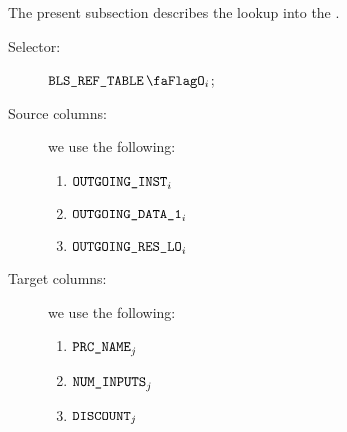 The present subsection describes the lookup into the \blsRefTable{}.
\begin{description}
	\item[Selector:] $\blsRefTableFlag{}_{i}$;
	\item[Source columns:] we use the following:
		\begin{multicols}{3}
			\begin{enumerate}
				\item $\texttt{OUTGOING\_INST}       _{i}$
				\item $\texttt{OUTGOING\_DATA\_1} _{i}$
				\item $\texttt{OUTGOING\_RES\_LO}      _{i}$
			\end{enumerate}
		\end{multicols}
	\item[Target columns:] we use the following:
		\begin{multicols}{3}
			\begin{enumerate}
				\item $\texttt{PRC\_NAME}        _{j}$
				\item $\texttt{NUM\_INPUTS} _{j}$
				\item $\texttt{DISCOUNT}       _{j}$
			\end{enumerate}
		\end{multicols}
\end{description}

